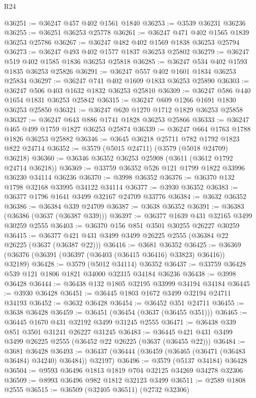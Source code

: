 \begin{lexlean}{R24}
\begin{coremodule}
@36251 := @36247 @457 @402 @1561 @1840
@36253 := @3539 @36231 @36236
@36255 := @36251 @36253 @25778
@36261 := @36247 @471 @402 @1565 @1839 @36253 @25786
@36267 := @36247 @482 @402 @1569 @1838 @36253 @25794
@36273 := @36247 @493 @402 @1577 @1837 @36253 @25802
@36279 := @36247 @519 @402 @1585 @1836 @36253 @25818
@36285 := @36247 @534 @402 @1593 @1835 @36253 @25826
@36291 := @36247 @557 @402 @1601 @1834 @36253 @25834
@36297 := @36247 @741 @402 @1609 @1833 @36253 @25890
@36303 := @36247 @506 @403 @1632 @1832 @36253 @25810
@36309 := @36247 @586 @440 @1654 @1831 @36253 @25842
@36315 := @36247 @609 @1266 @1691 @1830 @36253 @25850
@36321 := @36247 @620 @1270 @1712 @1829 @36253 @25858
@36327 := @36247 @643 @886 @1741 @1828 @36253 @25866
@36333 := @36247 @465 @499 @1759 @1827 @36253 @25874
@36339 := @36247 @664 @1763 @1788 @1826 @36253 @25882
@36346 := @3645 @36218 @25711 @782 @1792 @1823 @822 @24714
@36352 := @3579 (@5015 @24711) (@3579 (@5018 @24709) @36218)
@36360 := @36346 @36352 @36253 @25908 (@3611 (@3612 @1792 @24714 @36218))
@36369 := @33759 @36352 @526 @121 @1799 @1822 @33996 @36230 @34114 @36236
@36370 := @3998 @36352
@36376 := @36370 @132 @1798 @32168 @33995 @34122 @34114
@36377 := @3930 @36352
@36383 := @36377 @1796 @1641 @3499 @32167 @24709 @33776
@36384 := @3632 @36352
@36386 := @36384 @339 @24709
@36387 := @3638 @36352
@36391 := @36383 (@36386 (@3637 (@36387 @339)))
@36397 := @36377 @1639 @431 @32165 @3499 @30259 @2555
@36403 := @36370 @156 @851 @3501 @30255 @26227 @30259
@36415 := @36377 @421 @431 @3499 @3499 @26225 @2555 (@36384 @22 @26225 (@3637 (@36387 @22)))
@36416 := @3681 @36352
@36425 := @36369 (@36376 (@36391 (@36397 (@36403 (@36415 @36416) @33823) @36416)) @32189)
@36428 := @3579 (@5012 @34114) @36352
@36437 := @33759 @36428 @539 @121 @1806 @1821 @34000 @32315 @34184 @36236
@36438 := @3998 @36428
@36444 := @36438 @132 @1805 @32195 @33999 @34194 @34184
@36445 := @3930 @36428
@36451 := @36445 @1803 @1672 @3499 @32194 @24711 @34193
@36452 := @3632 @36428
@36454 := @36452 @351 @24711
@36455 := @3638 @36428
@36459 := @36451 (@36454 (@3637 (@36455 @351)))
@36465 := @36445 @1670 @431 @32192 @3499 @31245 @2555
@36471 := @36438 @339 @851 @3501 @31241 @26227 @31245
@36483 := @36445 @421 @431 @3499 @3499 @26225 @2555 (@36452 @22 @26225 (@3637 (@36455 @22)))
@36484 := @3681 @36428
@36493 := @36437 (@36444 (@36459 (@36465 (@36471 (@36483 @36484) @34240) @36484)) @32197)
@36496 := @3579 (@5137 @34184) @36428
@36504 := @9593 @36496 @1813 @1819 @704 @32125 @34269 @34278 @32306
@36509 := @8993 @36496 @982 @1812 @32123 @3499
@36511 := @2589 @1808 @2555
@36515 := @36509 (@32405 @36511) (@2732 @32306)

\end{coremodule}
\end{lexlean}
